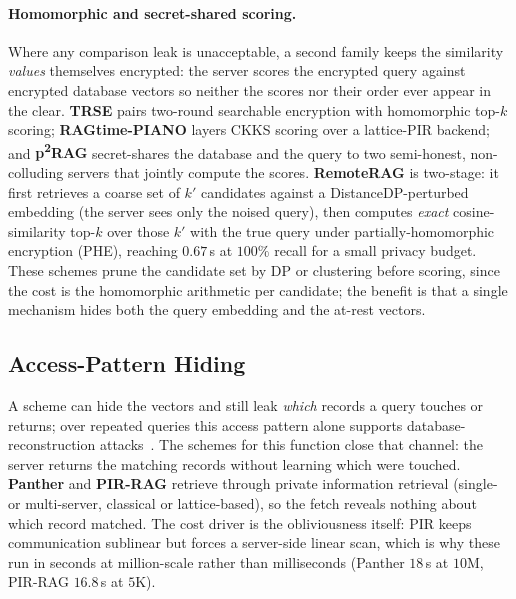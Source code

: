 \paragraph{Homomorphic and secret-shared scoring.}
Where any comparison leak is unacceptable, a second family keeps the similarity \emph{values}
themselves encrypted: the server scores the encrypted query against encrypted database vectors so
neither the scores nor their order ever appear in the clear. \textbf{TRSE} pairs two-round searchable
encryption with homomorphic top-$k$ scoring; \textbf{RAGtime-PIANO} layers CKKS scoring over a
lattice-PIR backend; and \textbf{p\textsuperscript{2}RAG} secret-shares the database and the query to two
semi-honest, non-colluding servers that jointly compute the scores. \textbf{RemoteRAG} is two-stage: it first retrieves a
coarse set of $k'$ candidates against a DistanceDP-perturbed embedding (the server sees only the
noised query), then computes \emph{exact} cosine-similarity
top-$k$ over those $k'$ with the true query under partially-homomorphic encryption (PHE), reaching
$0.67$\,s at $100\%$ recall for a small privacy budget. These schemes prune the
candidate set by DP or clustering before scoring, since the cost is the homomorphic arithmetic per
candidate; the benefit is that a single mechanism hides both the query embedding and the at-rest
vectors.

\subsection{Access-Pattern Hiding}
\label{ssec:retr-access}
A scheme can hide the vectors and still leak \emph{which} records a query touches or returns; over
repeated queries this access pattern alone supports database-reconstruction
attacks~\citep{kellaris2016leakage}. The schemes for this function close that channel: the server
returns the matching records without learning which were touched. \textbf{Panther} and \textbf{PIR-RAG} retrieve
through private information retrieval (single- or multi-server, classical or lattice-based), so the
fetch reveals nothing about which record matched. The cost driver is the obliviousness itself:
PIR keeps communication sublinear but forces a server-side linear scan, which is why these run in
seconds at million-scale rather than milliseconds (Panther $18$\,s at $10$M, PIR-RAG $16.8$\,s at
$5$K).

